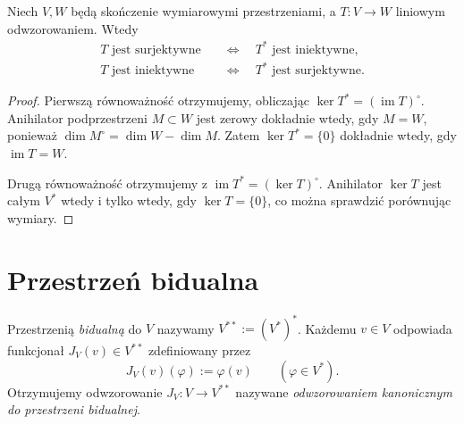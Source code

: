 \begin{wniosek}
\label{cor:lin7-injekcja-surjekcja}
Niech \(V,W\) będą skończenie
wymiarowymi przestrzeniami,
a \(T\colon V\to W\) liniowym
odwzorowaniem. Wtedy
\[
 \begin{aligned}
 T\text{ jest surjektywne}
 &\quad\Longleftrightarrow\quad
 T^*\text{ jest iniektywne},\\
 T\text{ jest iniektywne}
 &\quad\Longleftrightarrow\quad
 T^*\text{ jest surjektywne}.
 \end{aligned}
\]
\end{wniosek}
\begin{proof}
Pierwszą równoważność otrzymujemy,
obliczając
\(\ker T^*=(\operatorname{im}T)^\circ\).
Anihilator podprzestrzeni
\(M\subset W\) jest zerowy dokładnie
wtedy, gdy \(M=W\), ponieważ
\(\dim M^\circ=\dim W-\dim M\).
Zatem \(\ker T^*=\{0\}\)
dokładnie wtedy, gdy
\(\operatorname{im}T=W\).

Drugą równoważność otrzymujemy z
\(\operatorname{im}T^*=(\ker T)^\circ\).
Anihilator \(\ker T\) jest całym \(V^*\)
wtedy i tylko wtedy, gdy \(\ker T=\{0\}\),
co można sprawdzić porównując wymiary.
\end{proof}

\section{Przestrzeń bidualna}
\label{sec:lin7-bidualnosc}

\begin{definicja}
\label{def:lin7-bidual}
Przestrzenią \emph{bidualną} do \(V\)
nazywamy \(V^{**}:=(V^*)^*\).
Każdemu \(v\in V\) odpowiada
funkcjonał \(J_V(v)\in V^{**}\)
zdefiniowany przez
\[
 J_V(v)(\varphi):=\varphi(v)
 \qquad(\varphi\in V^*).
\]
Otrzymujemy odwzorowanie
\(J_V\colon V\to V^{**}\)
nazywane \emph{odwzorowaniem
kanonicznym do przestrzeni bidualnej}.
\end{definicja}


